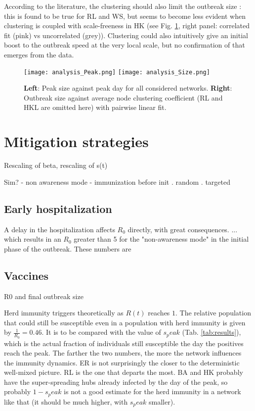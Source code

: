 \documentclass[DIV=12, BCOR=0pt]{scrartcl}  %
\begin{document}
  According to the literature, the clustering should also limit the outbreak size \citep{PastorSatorras}: this is found to be true for RL and WS, but seems to become less evident when clustering is coupled with scale-freeness in HK (see Fig. \ref{fig:analysis}, right panel: correlated fit (pink) vs uncorrelated (grey)). 
  Clustering could also intuitively give an initial boost to the outbreak speed at the very local scale, but no confirmation of that emerges from the data.
  

	\begin{figure}[h]
		\centering
		\texttt{[image: analysis\_Peak.png]}
		\texttt{[image: analysis\_Size.png]}
		\caption{\textbf{Left}: Peak size against peak day for all considered networks.
			\textbf{Right}: Outbreak size against average node clustering coefficient (RL and HKL are omitted here) with pairwise linear fit.}
		\label{fig:analysis}
	\end{figure}
  

	\section{Mitigation strategies} %
	\label{sec:immuni}
	
	Rescaling of beta, rescaling of s(t)
	
	Sim? 
	- non awareness mode
	- immunization before init
	. random
	. targeted
	

	\subsection{Early hospitalization}
	A delay in the hospitalization affects $R_0$ directly, with great consequences.
	... which results in an $R_0$ greater than 5 for the "non-awareness mode" in the initial phase of the outbreak. These numbers are
	\citep{Firth2020} 
	
	\subsection{Vaccines}
	R0 and final outbreak size
	
	Herd immunity triggers theoretically as $R(t)$ reaches $1$. The relative population that could still be susceptible even in a population with herd immunity is given by $\frac{1}{R_0} = 0.46$. It is to be compared with the value of $s_peak$ (Tab. \ref{tab:results}), which is the actual fraction of individuals still susceptible the day the positives reach the peak. The farther the two numbers, the more the network influences the immunity dynamics. ER is not surprisingly the closer to the deterministic well-mixed picture. RL is the one that departs the most. BA and HK probably have the super-spreading hubs already infected by the day of the peak, so probably $1 - s_peak$ is not a good estimate for the herd immunity in a network like that (it should be much higher, with $s_peak$ smaller).
	
\end{document}
